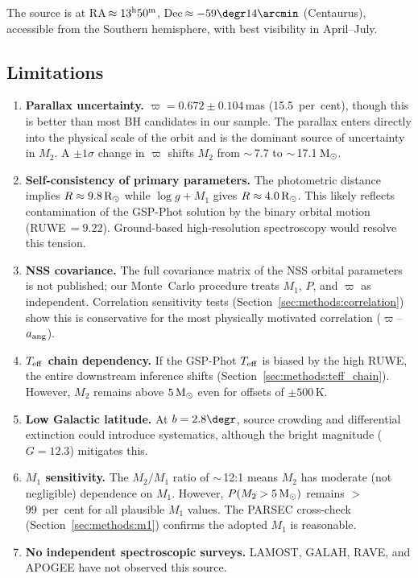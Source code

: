 \documentclass[usenatbib,fleqn]{mnras}
\newcommand{\Msun}{{\rm M}_\odot}
\newcommand{\Rsun}{{\rm R}_\odot}
\begin{document}
The source is at RA\,$\approx 13^{\rm h}50^{\rm m}$,
Dec\,$\approx -59\degr14\arcmin$ (Centaurus), accessible from
the Southern hemisphere, with best visibility in April--July.

\subsection{Limitations}
\label{sec:limitations}

\begin{enumerate}
\item \textbf{Parallax uncertainty.}  $\varpi = 0.672 \pm
  0.104$\,mas (15.5~per~cent), though this is better than
  most BH candidates in our sample.  The parallax enters
  directly into the physical scale of the orbit and is the
  dominant source of uncertainty in $M_2$.  A $\pm 1\sigma$
  change in $\varpi$ shifts $M_2$ from $\sim$\,7.7 to
  $\sim$\,17.1$\,\Msun$.
\item \textbf{Self-consistency of primary parameters.}  The
  photometric distance implies $R \approx 9.8\,\Rsun$ while
  $\log g + M_1$ gives $R \approx 4.0\,\Rsun$.  This likely
  reflects contamination of the GSP-Phot solution by the binary
  orbital motion (RUWE$\,= 9.22$).  Ground-based high-resolution
  spectroscopy would resolve this tension.
\item \textbf{NSS covariance.}  The full covariance matrix of the
  NSS orbital parameters is not published; our Monte~Carlo
  procedure treats $M_1$, $P$, and $\varpi$ as independent.
  Correlation sensitivity tests
  (Section~\ref{sec:methods:correlation}) show this is
  conservative for the most physically motivated correlation
  ($\varpi$--$a_{\rm ang}$).
\item \textbf{$T_{\rm eff}$ chain dependency.}  If the GSP-Phot
  $T_{\rm eff}$ is biased by the high RUWE, the entire
  downstream inference shifts
  (Section~\ref{sec:methods:teff_chain}).  However, $M_2$
  remains above $5\,\Msun$ even for offsets of $\pm 500\,$K.
\item \textbf{Low Galactic latitude.}  At $b = 2.8\degr$,
  source crowding and differential extinction could introduce
  systematics, although the bright magnitude ($G = 12.3$)
  mitigates this.
\item \textbf{$M_1$ sensitivity.}  The $M_2/M_1$ ratio of
  $\sim$\,12:1 means $M_2$ has moderate (not negligible)
  dependence on $M_1$.  However, $P(M_2 > 5\,\Msun)$ remains
  $>$99~per~cent for all plausible $M_1$ values.  The PARSEC
  cross-check (Section~\ref{sec:methods:m1}) confirms the
  adopted $M_1$ is reasonable.
\item \textbf{No independent spectroscopic surveys.}  LAMOST,
  GALAH, RAVE, and APOGEE have not observed this source.
\end{enumerate}
\end{document}
